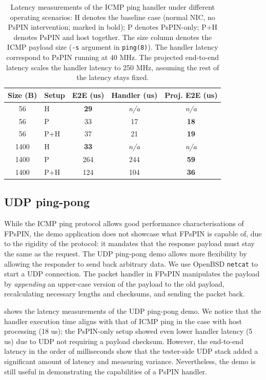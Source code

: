 \begin{table}[!ht]
    \centering
    \begin{tabular}{clccc}
    \toprule
    Size (B) & Setup & E2E (us) & Handler (us) & Proj. E2E (us) \\ \midrule
    56 & H & \textbf{29} & \emph{n/a} & \emph{n/a} \\
    56 & P & 33 & 17 & {\color{acmgreen}\textbf{18}} \\
    56 & P+H & 37 & 21 & {\color{acmgreen}\textbf{19}} \\ \midrule
    1400 & H & \textbf{33} & \emph{n/a} & \emph{n/a} \\
    1400 & P & 264 & 244 & {\color{acmyellow}\textbf{59}} \\
    1400 & P+H & 124 & 104 & {\color{acmyellow}\textbf{36}}\\
    \bottomrule
    \end{tabular}
    \caption{Latency measurements of the ICMP ping handler under different operating scenarios: H denotes the baseline case (normal NIC, no PsPIN intervention; marked in bold); P denotes PsPIN-only; P+H denotes PsPIN and host together.  The size column denotes the ICMP payload size (\texttt{-s} argument in \texttt{ping(8)}).  The handler latency correspond to PsPIN running at 40 MHz.  The projected end-to-end latency scales the handler latency to 250 MHz, assuming the rest of the latency stays fixed.}
    \label{tab:icmp-ping}
\end{table}

\subsection{UDP ping-pong}

While the ICMP ping protocol allows good performance characterisations of FPsPIN, the demo application does not showcase what FPsPIN is capable of, due to the rigidity of the protocol: it mandates that the response payload must stay the same as the request.  The UDP ping-pong demo allows more flexibility by allowing the responder to send back arbitrary data.  We use OpenBSD \texttt{netcat} to start a UDP connection.  The packet handler in FPsPIN manipulates the payload by \emph{appending} an upper-case version of the payload to the old payload, recalculating necessary lengths and checksums, and sending the packet back.

 shows the latency measurements of the UDP ping-pong demo.  We notice that the handler execution time aligns with that of ICMP ping in the case with host processing (18 us); the PsPIN-only setup showed even lower handler latency (5 us) due to UDP not requiring a payload checksum.  However, the end-to-end latency in the order of milliseconds show that the tester-side UDP stack added a significant amount of latency and measuring variance.  Nevertheless, the demo is still useful in demonstrating the capabilities of a PsPIN handler.

